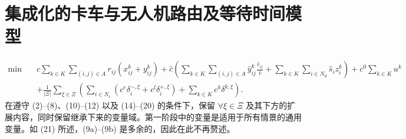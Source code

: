 \documentclass[10pt]{article}
\begin{document}
\section*{集成化的卡车与无人机路由及等待时间模型}
\begin{equation}
\begin{aligned}
\min\quad &c\sum_{k\in K}\sum_{(i,j)\in A}r_{ij}(x_{ij}^k+y_{ij}^k)
+\hat c\left(\sum_{k\in K}\sum_{(i,j)\in A}\hat y_{ij}^k\frac{\hat r_{ij}}{\hat v}
+\sum_{k\in K}\sum_{i\in N_d}\hat s_i z_i^k\right)
+c^0\sum_{k\in K}u^k\\
&+\frac{1}{|\Xi|}\sum_{\xi\in\Xi}\left(\sum_{i\in N_c}(c^e\delta_i^{-,\xi}+c^l\delta_i^{+,\xi})+\sum_{k\in K}c^k\delta^{k,\xi}\right).
\end{aligned}\tag{21}
\end{equation}
\noindent 在遵守 (2)--(8)、(10)--(12) 以及 (14)--(20) 的条件下，保留 $\forall\xi\in\Xi$ 及其下方的扩展内容，同时保留继承下来的变量域。第一阶段中的变量是适用于所有情景的通用变量。如 (21) 所述，(9a)--(9b) 是多余的，因此在此不再赘述。
\end{document}
